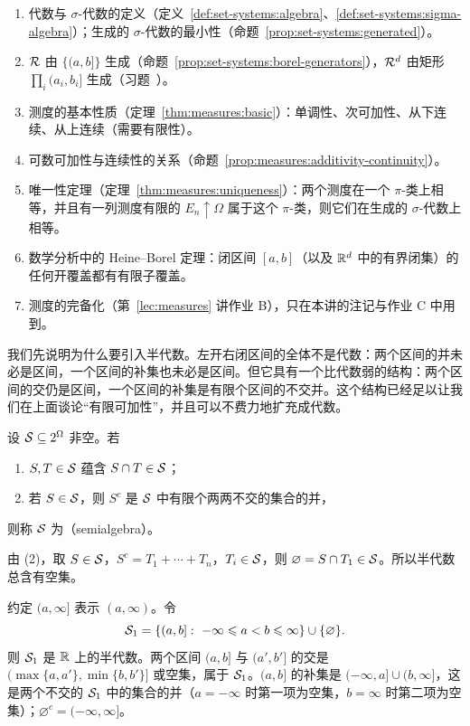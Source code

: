 \begin{enumerate}
\item 代数与 $\sigma$-代数的定义（定义~\ref{def:set-systems:algebra}、\ref{def:set-systems:sigma-algebra}）；生成的 $\sigma$-代数的最小性（命题~\ref{prop:set-systems:generated}）。
\item $\mathcal{R}$ 由 $\{(a,b]\}$ 生成（命题~\ref{prop:set-systems:borel-generators}），$\mathcal{R}^d$ 由矩形 $\prod_i(a_i,b_i]$ 生成（习题~）。
\item 测度的基本性质（定理~\ref{thm:measures:basic}）：单调性、次可加性、从下连续、从上连续（需要有限性）。
\item 可数可加性与连续性的关系（命题~\ref{prop:measures:additivity-continuity}）。
\item 唯一性定理（定理~\ref{thm:measures:uniqueness}）：两个测度在一个 $\pi$-类上相等，并且有一列测度有限的 $E_n\uparrow\Omega$ 属于这个 $\pi$-类，则它们在生成的 $\sigma$-代数上相等。
\item 数学分析中的 Heine--Borel 定理：闭区间 $[a,b]$（以及 $\mathbb{R}^d$ 中的有界闭集）的任何开覆盖都有有限子覆盖。
\item 测度的完备化（第~\ref{lec:measures} 讲作业 B），只在本讲的注记与作业 C 中用到。
\end{enumerate}


我们先说明为什么要引入半代数。左开右闭区间的全体不是代数：两个区间的并未必是区间，一个区间的补集也未必是区间。但它具有一个比代数弱的结构：两个区间的交仍是区间，一个区间的补集是有限个区间的不交并。这个结构已经足以让我们在上面谈论“有限可加性”，并且可以不费力地扩充成代数。

\begin{definition}[半代数]\label{def:extension:semialgebra}
设 $\mathcal{S}\subseteq2^\Omega$ 非空。若
\begin{enumerate}
\item $S,T\in\mathcal{S}$ 蕴含 $S\cap T\in\mathcal{S}$；
\item 若 $S\in\mathcal{S}$，则 $S^c$ 是 $\mathcal{S}$ 中有限个两两不交的集合的并，
\end{enumerate}
则称 $\mathcal{S}$ 为（semialgebra）。
\end{definition}

由 (2)，取 $S\in\mathcal{S}$，$S^c=T_1+\cdots+T_n$，$T_i\in\mathcal{S}$，则 $\varnothing=S\cap T_1\in\mathcal{S}$。所以半代数总含有空集。

\begin{example}[左开右闭区间]\label{ex:extension:S1}
约定 $(a,\infty]$ 表示 $(a,\infty)$。令
\[
\mathcal{S}_1=\{(a,b]:\ -\infty\leqslant a<b\leqslant\infty\}\cup\{\varnothing\}.
\]
则 $\mathcal{S}_1$ 是 $\mathbb{R}$ 上的半代数。两个区间 $(a,b]$ 与 $(a',b']$ 的交是 $(\max\{a,a'\},\min\{b,b'\}]$ 或空集，属于 $\mathcal{S}_1$。$(a,b]$ 的补集是 $(-\infty,a]\cup(b,\infty]$，这是两个不交的 $\mathcal{S}_1$ 中的集合的并（$a=-\infty$ 时第一项为空集，$b=\infty$ 时第二项为空集）；$\varnothing^c=(-\infty,\infty]$。
\end{example}

